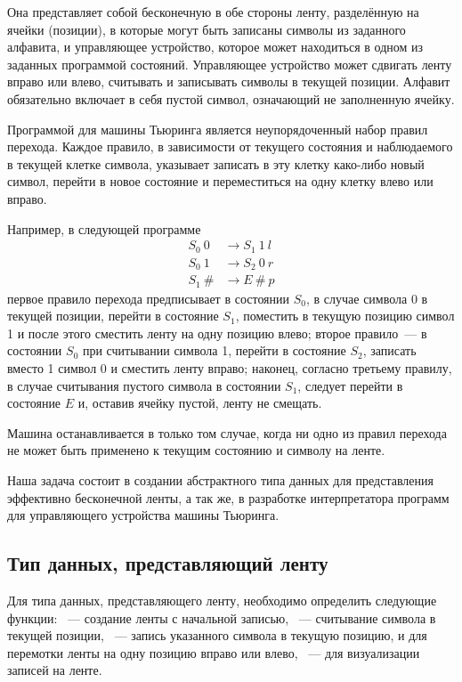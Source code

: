 Она представляет собой бесконечную в обе стороны ленту, разделённую на ячейки (позиции), в которые могут быть записаны символы из заданного алфавита, и управляющее устройство, которое может находиться в одном из заданных программой состояний. Управляющее устройство может сдвигать ленту вправо или влево, считывать и записывать символы в текущей позиции. Алфавит обязательно включает в себя пустой символ, означающий не заполненную ячейку.

Программой для машины Тьюринга является неупорядоченный набор правил перехода. Каждое правило, в зависимости от текущего состояния и наблюдаемого в текущей клетке символа, указывает записать в эту клетку како-либо новый символ, перейти в новое состояние и переместиться на одну клетку влево или вправо. 

Например, в следующей программе
\label{TM-prog}
\begin{align*}
S_0~0 &\to S_1~1~l\\
S_0~1 &\to S_2~0~r\\
S_1~\# &\to E~\#~p
\end{align*}
первое правило перехода предписывает в состоянии $S_0$, в случае символа 0 в текущей позиции, перейти в состояние $S_1$, поместить в текущую позицию символ 1 и после этого сместить ленту на одну позицию влево; второе правило~--- в состоянии $S_0$ при считывании символа 1, перейти в состояние $S_2$, записать вместо 1 символ 0 и сместить ленту вправо; наконец, согласно третьему правилу, в случае считывания пустого символа в состоянии $S_1$, следует перейти в состояние $E$ и, оставив ячейку пустой, ленту не смещать.

Машина останавливается в только том случае, когда ни одно из правил перехода не может быть применено к текущим состоянию и символу на ленте.

Наша задача состоит в создании абстрактного типа данных для представления эффективно бесконечной ленты, а так же, в разработке интерпретатора программ для управляющего устройства машины Тьюринга.

\subsection*{Тип данных, представляющий ленту}
Для типа данных, представляющего ленту, необходимо определить следующие функции: ~--- создание ленты с начальной записью, ~--- считывание символа в текущей позиции, ~--- запись указанного символа в текущую позицию,  и  для перемотки ленты на одну позицию вправо или влево, ~--- для визуализации записей на ленте.

